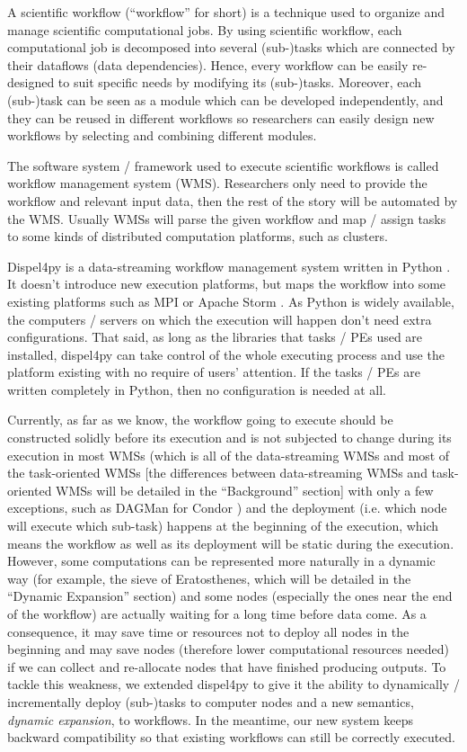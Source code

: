 \documentclass[•]{article}
\begin{document}
	A scientific workflow (``workflow'' for short) is a technique used to organize and manage scientific computational jobs. By using scientific workflow, each computational job is decomposed into several (sub-)tasks which are connected by their dataflows (data dependencies). Hence, every workflow can be easily re-designed to suit specific needs by modifying its (sub-)tasks. Moreover, each (sub-)task can be seen as a module which can be developed independently, and they can be reused in different workflows so researchers can easily design new workflows by selecting and combining different modules.
	
	The software system / framework used to execute scientific workflows is called workflow management system (WMS). Researchers only need to provide the workflow and relevant input data, then the rest of the story will be automated by the WMS. Usually WMSs will parse the given workflow and map / assign tasks to some kinds of distributed computation platforms, such as clusters.
	
	Dispel4py is a data-streaming workflow management system written in Python \cite{doi:10.1177/1094342016649766}. It doesn't introduce new execution platforms, but maps the workflow into some existing platforms such as MPI \cite{MPI_forum} or Apache Storm \cite{apache_storm}. As Python is widely available, the computers / servers on which the execution will happen don't need extra configurations. That said, as long as the libraries that tasks / PEs used are installed, dispel4py can take control of the whole executing process and use the platform existing with no require of users' attention. If the tasks / PEs are written completely in Python, then no configuration is needed at all.
	
	Currently, as far as we know, the workflow going to execute should be constructed solidly before its execution and is not subjected to change during its execution in most WMSs (which is all of the data-streaming WMSs and most of the task-oriented WMSs [the differences between data-streaming WMSs and task-oriented WMSs will be detailed in the ``Background'' section] with only a few exceptions, such as DAGMan for Condor \cite{couvares2007workflow}) and the deployment (i.e. which node will execute which sub-task) happens at the beginning of the execution, which means the workflow as well as its deployment will be static during the execution. However, some computations can be represented more naturally in a dynamic way (for example, the sieve of Eratosthenes, which will be detailed in the ``Dynamic Expansion'' section) and some nodes (especially the ones near the end of the workflow) are actually waiting for a long time before data come. As a consequence, it may save time or resources not to deploy all nodes in the beginning and may save nodes (therefore lower computational resources needed) if we can collect and re-allocate nodes that have finished producing outputs. To tackle this weakness, we extended dispel4py to give it the ability to dynamically / incrementally deploy (sub-)tasks to computer nodes and a new semantics, \textit{dynamic expansion}, to workflows. In the meantime, our new system keeps backward compatibility so that existing workflows can still be correctly executed.
	
\end{document}

